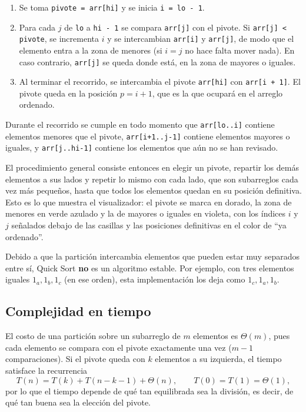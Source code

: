 \begin{enumerate}
  \item Se toma \texttt{pivote = arr[hi]} y se inicia \texttt{i = lo - 1}.
  \item Para cada $j$ de \texttt{lo} a \texttt{hi - 1} se compara \texttt{arr[j]} con el pivote. Si \texttt{arr[j] < pivote}, se incrementa $i$ y se intercambian \texttt{arr[i]} y \texttt{arr[j]}, de modo que el elemento entra a la zona de menores (si $i = j$ no hace falta mover nada). En caso contrario, \texttt{arr[j]} se queda donde está, en la zona de mayores o iguales.
  \item Al terminar el recorrido, se intercambia el pivote \texttt{arr[hi]} con \texttt{arr[i + 1]}. El pivote queda en la posición $p = i + 1$, que es la que ocupará en el arreglo ordenado.
\end{enumerate}

Durante el recorrido se cumple en todo momento que \texttt{arr[lo..i]} contiene elementos menores que el pivote, \texttt{arr[i+1..j-1]} contiene elementos mayores o iguales, y \texttt{arr[j..hi-1]} contiene los elementos que aún no se han revisado.

El procedimiento general consiste entonces en elegir un pivote, repartir los demás elementos a sus lados y repetir lo mismo con cada lado, que son subarreglos cada vez más pequeños, hasta que todos los elementos quedan en su posición definitiva. Esto es lo que muestra el visualizador: el pivote se marca en dorado, la zona de menores en verde azulado y la de mayores o iguales en violeta, con los índices $i$ y $j$ señalados debajo de las casillas y las posiciones definitivas en el color de ``ya ordenado''.

Debido a que la partición intercambia elementos que pueden estar muy separados entre sí, Quick Sort \textbf{no} es un algoritmo estable. Por ejemplo, con tres elementos iguales $1_a, 1_b, 1_c$ (en ese orden), esta implementación los deja como $1_c, 1_a, 1_b$.

\subsection{Complejidad en tiempo}

El costo de una partición sobre un subarreglo de $m$ elementos es $\Theta(m)$, pues cada elemento se compara con el pivote exactamente una vez ($m - 1$ comparaciones). Si el pivote queda con $k$ elementos a su izquierda, el tiempo satisface la recurrencia
\[
  T(n) = T(k) + T(n - k - 1) + \Theta(n), \qquad T(0) = T(1) = \Theta(1),
\]
por lo que el tiempo depende de qué tan equilibrada sea la división, es decir, de qué tan buena sea la elección del pivote.

